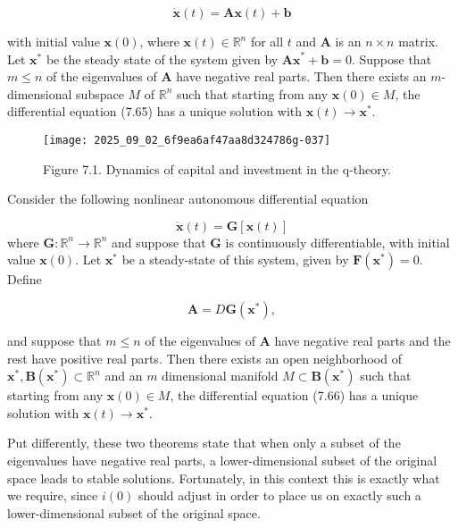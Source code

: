 \documentclass[\topdir/lecture_notes.tex]{subfiles}
\begin{document}
\[
\dot{\mathbf{x}}(t)=\mathbf{A} \mathbf{x}(t)+\mathbf{b}
\]

with initial value $\mathbf{x}(0)$, where $\mathbf{x}(t) \in \mathbb{R}^{n}$ for all $t$ and $\mathbf{A}$ is an $n \times n$ matrix. Let $\mathbf{x}^{*}$ be the steady state of the system given by $\mathbf{A x}^{*}+\mathbf{b}=0$. Suppose that $m \leq n$ of the eigenvalues of $\mathbf{A}$ have negative real parts. Then there exists an $m$-dimensional subspace $M$ of $\mathbb{R}^{n}$ such that starting from any $\mathbf{x}(0) \in M$, the differential equation (7.65) has a unique solution with $\mathbf{x}(t) \rightarrow \mathbf{x}^{*}$.

\begin{figure}[h]
\begin{center}
  \texttt{[image: 2025\_09\_02\_6f9ea6af47aa8d324786g-037]}
\captionsetup{labelformat=empty}
\caption{Figure 7.1. Dynamics of capital and investment in the q-theory.}
\end{center}
\end{figure}

\begin{theorem}
Consider the following nonlinear autonomous differential equation
\end{theorem}

\[
\dot{\mathbf{x}}(t)=\mathbf{G}[\mathbf{x}(t)]
\]
where $\mathbf{G}: \mathbb{R}^{n} \rightarrow \mathbb{R}^{n}$ and suppose that $\mathbf{G}$ is continuously differentiable, with initial value $\mathbf{x}(0)$. Let $\mathbf{x}^{*}$ be a steady-state of this system, given by $\mathbf{F}\left(\mathbf{x}^{*}\right)=0$. Define

\[
\mathbf{A}=D \mathbf{G}\left(\mathbf{x}^{*}\right),
\]

and suppose that $m \leq n$ of the eigenvalues of $\mathbf{A}$ have negative real parts and the rest have positive real parts. Then there exists an open neighborhood of $\mathbf{x}^{*}, \mathbf{B}\left(\mathbf{x}^{*}\right) \subset \mathbb{R}^{n}$ and an $m$ dimensional manifold $M \subset \mathbf{B}\left(\mathbf{x}^{*}\right)$ such that starting from any $\mathbf{x}(0) \in M$, the differential equation (7.66) has a unique solution with $\mathbf{x}(t) \rightarrow \mathbf{x}^{*}$.

Put differently, these two theorems state that when only a subset of the eigenvalues have negative real parts, a lower-dimensional subset of the original space leads to stable solutions. Fortunately, in this context this is exactly what we require, since $i(0)$ should adjust in order to place us on exactly such a lower-dimensional subset of the original space.
\end{document}
